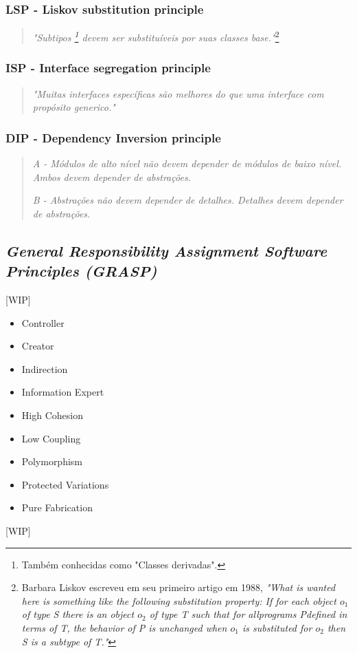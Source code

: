 \documentclass[12pt]{article}
\begin{document}
\subsubsection{LSP - Liskov substitution principle}
\begin{quote}
	\textit{"Subtipos \footnote{Também conhecidas como "Classes derivadas".} devem ser substituíveis por suas classes base."}\footnote{Barbara Liskov escreveu em seu primeiro artigo em 1988, \textit{"What is wanted here is something like the following substitution property: If for each object $ o_1 $ of type S there is an object $ o_2 $ of type T such that for allprograms Pdefined in terms of T, the behavior of P is unchanged when $ o_1 $ is substituted for $ o_2 $ then S is a subtype of T."} }	
\end{quote}
\subsubsection{ISP - Interface segregation principle}
\begin{quote}
	\textit{"Muitas interfaces específicas são melhores do que uma interface com propósito generico."}	
\end{quote}
\subsubsection{DIP - Dependency Inversion principle}
\begin{quote}
	\textit{A - Módulos de alto nível não devem depender de módulos de baixo nível. Ambos devem depender de abstrações.}
	
	\textit{B -  Abstrações não devem depender de detalhes. Detalhes devem depender de abstrações.}	
\end{quote}

\subsection{\textit{General Responsibility Assignment Software Principles (GRASP)}} \label{sec:grasp}
[WIP]
\begin{itemize}
	\item Controller	
	\item Creator
	\item Indirection
	\item Information Expert
	\item High Cohesion
	\item Low Coupling
	\item Polymorphism
	\item Protected Variations
	\item Pure Fabrication
\end{itemize}
[WIP]
\end{document}
